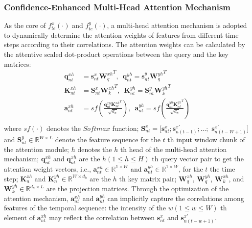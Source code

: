 \documentclass[review]{elsarticle}
\begin{document}
\subsubsection{Confidence-Enhanced Multi-Head Attention Mechanism}
\label{conf}
As the core of $f^x_{te}(\cdot)$ and $f^y_{te}(\cdot)$, a multi-head attention mechanism is adopted to dynamically determine the attention weights of features from different time steps according to their correlations. The attention weights can be calculated by the attentive scaled dot-product operations between the query and the key matrices:
\begin{equation}
	\label{eq:bs1}
	\begin{aligned}
		\textbf{q}^{xh}_{nt} & = \textbf{s}^x_{nt}{\textbf{W}^{xh}_{q}}^T,\,\,\,	\textbf{q}^{yh}_{nt} = \textbf{s}^y_{nt}{\textbf{W}^{yh}_{q}}^T \\
		\textbf{K}^{xh}_{nt} & = \textbf{S}^x_{nt}{\textbf{W}^{xh}_{k}}^T,\,\,\,
		\textbf{K}^{yh}_{nt} = \textbf{S}^y_{nt}{\textbf{W}^{yh}_{k}}^T \\
		\textbf{a}^{xh}_{nt} & = sf(\frac{\textbf{q}^{xh}_{nt} {\textbf{K}^{xh}_{nt}}^T}{\sqrt{d_h}}),\,\,\,\textbf{a}^{yh}_{nt} = sf(\frac{\textbf{q}^{yh}_{nt} {\textbf{K}^{yh}_{nt}}^T}{\sqrt{d_h}})\\
	\end{aligned}
\end{equation}
where $sf(\cdot)$ denotes the $Softmax$ function; $\textbf{S}^{x}_{nt} = [\textbf{s}^{x}_{nt}; \textbf{s}^{x'}_{n(t-1)};...;$ $\textbf{s}^{x'}_{n(t-W+1)}]$ and $\textbf{S}^{y}_{nt} \in \mathbb{R}^{W \times L}$ denote the feature sequence for the $t$ th input window chunk of the attention module; $h$ denotes the $h$ th head of the multi-head attention mechanism; $\textbf{q}^{xh}_{nt}$ and $\textbf{q}^{xh}_{nt}$ are the $h (1\leq h \leq H)$ th query vector pair to get the attention weight vectors, i.e., $\textbf{a}^{xh}_{nt} \in \mathbb{R}^{1 \times W}$ and $\textbf{a}^{yh}_{nt} \in \mathbb{R}^{1 \times W}$, for the $t$ the time step; $\textbf{K}^{xh}_{n}$ and $\textbf{K}^{yh}_{n} \in \mathbb{R}^{W \times d_h}$ are the $h$ th key matrix pair; $\textbf{W}^{xh}_{q}$, $\textbf{W}^{yh}_{q} $, $\textbf{W}^{xh}_{k}$, and $\textbf{W}^{yh}_{k} \in \mathbb{R}^{d_h \times L}$ are the projection matrices. Through the optimization of the attention mechanism, $\textbf{a}^{xh}_{nt}$ and $\textbf{a}^{yh}_{nt}$ can implicitly capture the correlations among features of the temporal sequence: the intensity of the $w (1 \leq w \leq W)$ th element of $\textbf{a}^{xh}_{nt}$ may reflect the correlation between $\textbf{s}^{x}_{nt}$ and $\textbf{s}^{x'}_{n(t-w+1)}$. 
\end{document}
